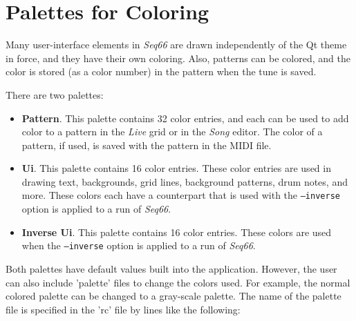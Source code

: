 %
%
%

\section{Palettes for Coloring}
\label{sec:palettes}

   Many user-interface elements in \textsl{Seq66} are drawn independently of
   the Qt theme in force, and they have their own coloring.  Also, patterns can
   be colored, and the color is stored (as a color number) in the pattern when
   the tune is saved.

   There are two palettes:

   \begin{itemize}
      \item \textbf{Pattern}.  This palette contains 32 color entries, and each
         can be used to add color to a pattern in the \textsl{Live} grid or in
         the \textsl{Song} editor.  The color of a pattern, if used, is saved
         with the pattern in the MIDI file.
      \item \textbf{Ui}.  This palette contains 16 color entries.  These
         color entries are used in drawing text, backgrounds, grid lines,
         background patterns, drum notes, and more.  These colors each have a
         counterpart that is used with the \texttt{--inverse} option is applied
         to a run of \textsl{Seq66}.
      \item \textbf{Inverse Ui}.  This palette contains 16 color entries.
         These colors are used when the \texttt{--inverse} option is applied
         to a run of \textsl{Seq66}.
   \end{itemize}

   Both palettes have default values built into the application.  However, the
   user can also include 'palette' files to change the colors used.  For
   example, the normal colored palette can be changed to a gray-scale palette.
   The name of the palette file is specified in the 'rc' file by lines like the
   following:

